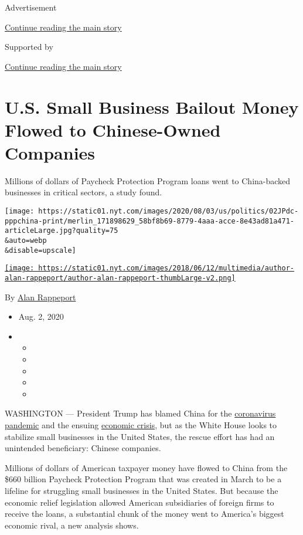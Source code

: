 Advertisement

\protect\hyperlink{after-top}{Continue reading the main story}

Supported by

\protect\hyperlink{after-sponsor}{Continue reading the main story}

\hypertarget{us-small-business-bailout-money-flowed-to-chinese-owned-companies}{%
\section{U.S. Small Business Bailout Money Flowed to Chinese-Owned
Companies}\label{us-small-business-bailout-money-flowed-to-chinese-owned-companies}}

Millions of dollars of Paycheck Protection Program loans went to
China-backed businesses in critical sectors, a study found.

\texttt{[image: https://static01.nyt.com/images/2020/08/03/us/politics/02JPdc-pppchina-print/merlin\_171898629\_58bf8b69-8779-4aaa-acce-8e43ad81a471-articleLarge.jpg?quality=75\\\&auto=webp\\\&disable=upscale]}

\href{https://www.nytimes.com/by/alan-rappeport}{\texttt{[image: https://static01.nyt.com/images/2018/06/12/multimedia/author-alan-rappeport/author-alan-rappeport-thumbLarge-v2.png]}}

By \href{https://www.nytimes.com/by/alan-rappeport}{Alan Rappeport}

\begin{itemize}
\item
  Aug. 2, 2020
\item
  \begin{itemize}
  \item
  \item
  \item
  \item
  \item
  \end{itemize}
\end{itemize}

WASHINGTON --- President Trump has blamed China for the
\href{https://www.nytimes.com/news-event/coronavirus}{coronavirus
pandemic} and the ensuing
\href{https://www.nytimes.com/2020/07/30/business/economy/q2-gdp-coronavirus-economy.html}{economic
crisis}, but as the White House looks to stabilize small businesses in
the United States, the rescue effort has had an unintended beneficiary:
Chinese companies.

Millions of dollars of American taxpayer money have flowed to China from
the \$660 billion Paycheck Protection Program that was created in March
to be a lifeline for struggling small businesses in the United States.
But because the economic relief legislation allowed American
subsidiaries of foreign firms to receive the loans, a substantial chunk
of the money went to America's biggest economic rival, a new analysis
shows.

